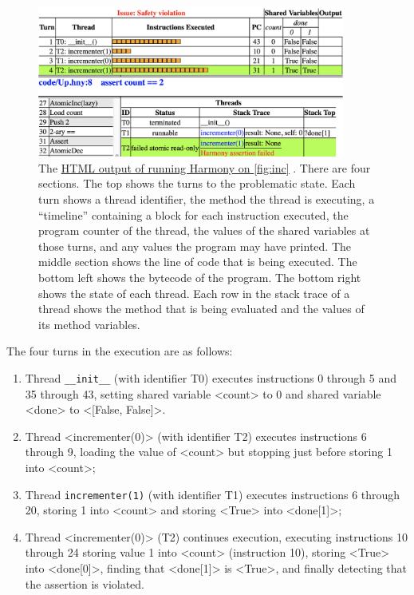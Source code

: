 \documentclass{report}
\newcommand{\harmonyref}[2]{%
\href{https://harmony.cs.cornell.edu/output/#1}{\underline{#2}}%
}
\begin{document}
\begin{figure}
\begin{center}
\includegraphics[width=0.9\textwidth]{figures/Up1.png}
\end{center}
\caption{The
\harmonyref{Up.html}{HTML output of running Harmony on \autoref{fig:inc}}.
There are four sections.
The top shows the turns to the problematic state.
Each turn shows a thread identifier, the method the thread is executing,
a ``timeline'' containing a block for each instruction executed, the
program counter of the thread, the values of the shared variables
at those turns, and any values the program may have printed.
The middle section shows the line of code that is being executed.
The bottom left shows the bytecode of the program.
The bottom right shows the state of each thread.
Each row in the stack trace of a thread shows
the method that is being evaluated and
the values of its method variables.}
\label{fig:inchtml1}
\end{figure}

The four turns in the execution are as follows:

\begin{enumerate}
\item Thread \texttt{\_\_init\_\_} (with identifier T0)
executes instructions 0 through 5 and 35 through 43, setting
shared variable <{count}> to 0 and
shared variable <{done}> to <{[False, False]}>.
\item Thread <{incrementer(0)}> (with identifier T2)
executes instructions 6 through 9, loading the value of
<{count}> but stopping just before storing 1 into <{count}>;
\item Thread \texttt{incrementer(1)} (with identifier T1)
executes instructions 6 through 20, storing 1 into
<{count}> and storing <{True}> into <{done[1]}>;
\item Thread <{incrementer(0)}> (T2)
continues execution, executing instructions 10 through 24
storing value 1 into <{count}> (instruction 10),
storing <{True}> into <{done[0]}>,
finding that <{done[1]}> is <{True}>,
and finally detecting that the assertion is violated.
\end{enumerate}
\end{document}
